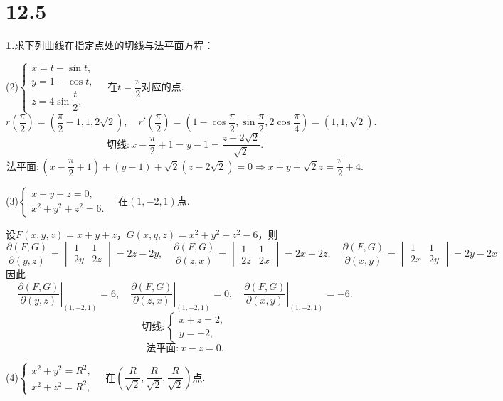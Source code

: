 \documentclass[12pt, a4paper]{article}
\begin{document}
\section*{12.5}
\textbf{1.}求下列曲线在指定点处的切线与法平面方程：

(2)\(\begin{cases}
x = t - \sin t, \\
y = 1 - \cos t, \\
z = 4 \sin\dfrac{t}{2},
\end{cases} \quad\)在\(t = \dfrac{\pi}{2}\)对应的点.
\[r\left(\dfrac{\pi}{2}\right) = \left(\dfrac{\pi}{2} - 1, 1, 2\sqrt{2}\right), \quad r'\left(\dfrac{\pi}{2}\right) = \left(1 - \cos\dfrac{\pi}{2}, \sin\dfrac{\pi}{2}, 2\cos\dfrac{\pi}{4}\right) = \left(1, 1, \sqrt{2}\right).\]
\[\text{切线}:x - \frac{\pi}{2} + 1 = y - 1 = \frac{z - 2\sqrt{2}}{\sqrt{2}}.\]
\[\text{法平面}: (x - \frac{\pi}{2} + 1) + (y - 1) + \sqrt{2}(z - 2\sqrt{2}) = 0 \Rightarrow x + y + \sqrt{2}z = \frac{\pi}{2} + 4.\]

(3)\(\begin{cases}
x + y + z = 0, \\
x^2 + y^2 + z^2 = 6.
\end{cases} \quad\)在\((1, -2, 1)\)点.

设\(F(x, y, z) = x + y + z\)，\(G(x, y, z) = x^2 + y^2 + z^2 - 6\)，则
\[\frac{\partial(F, G)}{\partial(y, z)} = \begin{vmatrix}
1 & 1 \\
2y & 2z
\end{vmatrix} = 2z - 2y, \quad \frac{\partial(F, G)}{\partial(z, x)} = \begin{vmatrix}
1 & 1 \\
2z & 2x
\end{vmatrix} = 2x - 2z, \quad \frac{\partial(F, G)}{\partial(x, y)} = \begin{vmatrix}
1 & 1 \\
2x & 2y
\end{vmatrix} = 2y - 2x\]
因此
\[\left.\frac{\partial(F, G)}{\partial(y, z)}\right|_{(1, -2, 1)} = 6, \quad \left.\frac{\partial(F, G)}{\partial(z, x)}\right|_{(1, -2, 1)} = 0, \quad \left.\frac{\partial(F, G)}{\partial(x, y)}\right|_{(1, -2, 1)} = -6.\]
\[\text{切线}: \begin{cases}
x + z = 2, \\
y = -2,
\end{cases}\]
\[\text{法平面}: x - z = 0.\]

(4)\(\begin{cases}
x^2 + y^2 = R^2, \\
x^2 + z^2 = R^2,
\end{cases} \quad\)在\(\left(\dfrac{R}{\sqrt{2}}, \dfrac{R}{\sqrt{2}}, \dfrac{R}{\sqrt{2}}\right)\)点.
\end{document}
